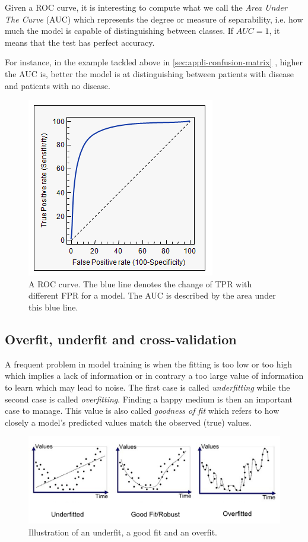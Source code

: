 \documentclass[11pt, openany]{report}
\theoremstyle{plain}
\theoremstyle{definition}
\theoremstyle{remark}
\begin{document}
Given a ROC curve, it is interesting to compute what we call the \textit{Area Under The Curve} (AUC) which represents the degree or measure of separability, i.e. how much the model is capable of distinguishing between classes. If $AUC = 1$, it means that the test has perfect accuracy. 

For instance, in the example tackled above in \autoref{sec:appli-confusion-matrix} , higher the AUC is, better the model is at distinguishing between patients with disease and patients with no disease.

\begin{figure}[h]
  \centering
  \includegraphics[scale=0.8]{figures/roc-curve.png}
  \caption{A ROC curve. The blue line denotes the change of TPR with different FPR for a model. The AUC is described by the area under this blue line. \cite{roc-schema} }
  \label{fig:roc-curve}
\end{figure}

\newpage
\subsection{Overfit, underfit and cross-validation}
A frequent problem in model training is when the fitting is too low or too high which implies a lack of information or in contrary a too large value of information to learn which may lead to noise. The first case is called \textit{underfitting} while the second case is called \textit{overfitting}. Finding a happy medium is then an important case to manage. This value is also called \textit{goodness of fit} which refers to how closely a model's predicted values match the observed (true) values.

\begin{figure}[h]
  \centering
  \includegraphics[scale=0.35]{figures/over-under-fit.png}
  \caption{Illustration of an underfit, a good fit and an overfit. \cite{over-under-fit-schema} }
  \label{fig:over-under-fit}
\end{figure}
\end{document}
